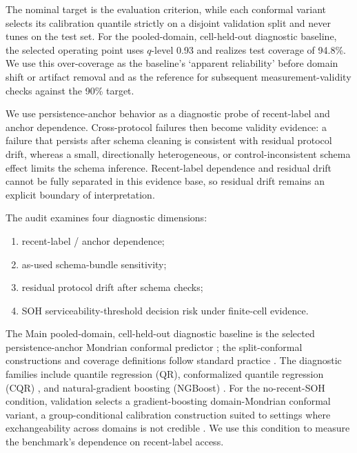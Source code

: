 \documentclass[
  number,
  preprint]{elsarticle}
\providecommand{\tightlist}{%
  \setlength{\itemsep}{0pt}\setlength{\parskip}{0pt}}
\begin{document}
The nominal target is the evaluation criterion, while each conformal
variant selects its calibration quantile strictly on a disjoint
validation split and never tunes on the test set. For the pooled-domain,
cell-held-out diagnostic baseline, the selected operating point uses
\(q\)-level 0.93 and realizes test coverage of 94.8\%. We use this
over-coverage as the baseline's `apparent reliability' before domain
shift or artifact removal and as the reference for subsequent
measurement-validity checks against the 90\% target.

We use persistence-anchor behavior as a diagnostic probe of recent-label
and anchor dependence. Cross-protocol failures then become validity
evidence: a failure that persists after schema cleaning is consistent
with residual protocol drift, whereas a small, directionally
heterogeneous, or control-inconsistent schema effect limits the schema
inference. Recent-label dependence and residual drift cannot be fully
separated in this evidence base, so residual drift remains an explicit
boundary of interpretation.

The audit examines four diagnostic dimensions:

\begin{enumerate}
\def\labelenumi{\arabic{enumi}.}
\tightlist
\item
  recent-label / anchor dependence;
\item
  as-used schema-bundle sensitivity;
\item
  residual protocol drift after schema checks;
\item
  SOH serviceability-threshold decision risk under finite-cell evidence.
\end{enumerate}

The Main pooled-domain, cell-held-out diagnostic baseline is the
selected persistence-anchor Mondrian conformal predictor
\citep{vovk2005algorithmic}; the split-conformal constructions and
coverage definitions follow standard practice
\citep{angelopoulos2023conformal}. The diagnostic families include
quantile regression (QR), conformalized quantile regression (CQR)
\citep{romano2019conformalized}, and natural-gradient boosting (NGBoost)
\citep{duan2020ngboost}. For the no-recent-SOH condition, validation
selects a gradient-boosting domain-Mondrian conformal variant, a
group-conditional calibration construction suited to settings where
exchangeability across domains is not credible \citep{barber2023beyond}.
We use this condition to measure the benchmark's dependence on
recent-label access.
\end{document}
